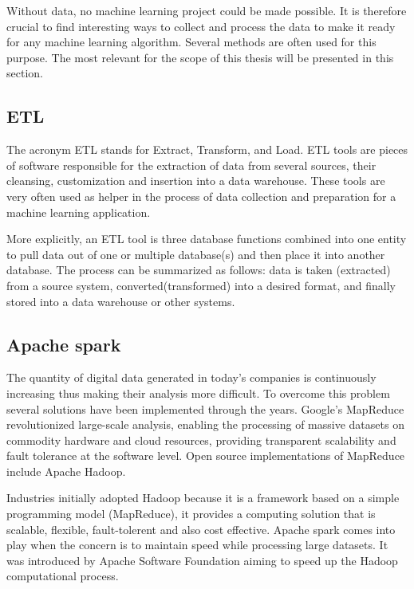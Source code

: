 \documentclass[LaM,binding=0.6cm, english]{sapthesis}
\begin{document}
Without data, no machine learning project could be made possible. It is therefore crucial to find interesting ways to collect and process the data to make it ready for any machine learning algorithm. Several methods are often used for this purpose. The most relevant for the scope of this thesis will be presented in this section. 

\subsection{ETL}

The acronym ETL stands for Extract, Transform, and Load. ETL tools are pieces of software responsible for the extraction of data from several sources, their cleansing, customization and insertion into a data warehouse.\cite{Vassiliadis2002} These tools are very often used as helper in the process of data collection and preparation for a machine learning application.

\par More explicitly, an ETL tool is three database functions combined into one entity to pull data out of one or multiple database(s) and then place it into another database. The process can be summarized as follows: data is taken (extracted) from a source system, converted(transformed) into a desired format, and finally stored into a data warehouse or other systems.

\subsection{Apache spark} \label{spark}

The quantity of digital data generated in today's companies is continuously increasing thus making their analysis more difficult. To overcome this problem several solutions have been implemented through the years. Google’s MapReduce revolutionized large-scale analysis, enabling the processing of massive datasets on commodity hardware and cloud resources, providing transparent scalability and fault tolerance at the software level.\cite{Capuccini2017} Open source implementations of MapReduce include Apache Hadoop.

\par Industries initially adopted Hadoop because it is a framework based on a simple programming model (MapReduce), it provides a computing solution that is scalable, flexible, fault-tolerent and also cost effective. Apache spark comes into play when the concern is to maintain speed while processing large datasets. It was introduced by Apache Software Foundation aiming to speed up the Hadoop computational process.
\end{document}
